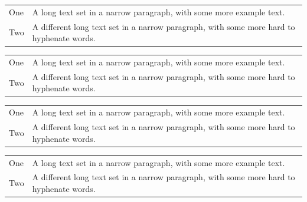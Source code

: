 \documentclass[a4paper]{article}
\begin{document}
\begin{table}
\begin{tabular}[t]{lp{3cm}}
One & A long text set in a narrow paragraph, with some more
example text. \\
Two & A different long text set in a narrow paragraph, with
some more hard to hyphenate words.
\end{tabular}%
\begin{tabular}[t]{l>{\raggedright\arraybackslash}p{3cm}}
One & A long text set in a narrow paragraph, with some more
example text. \\
Two & A different long text set in a narrow paragraph, with
some more hard to hyphenate words.
\end{tabular}%
\begin{tabular}[t]{l>{\RaggedRight}p{3cm}}
One & A long text set in a narrow paragraph, with some more
example text. \\
Two & A different long text set in a narrow paragraph, with
some more hard to hyphenate words.
\end{tabular}
\footnotesize
\begin{tabular}[t]{lp{3cm}}
One & A long text set in a narrow paragraph, with some more
example text. \\
Two & A different long text set in a narrow paragraph, with
some more hard to hyphenate words.
\end{tabular}
\end{table}
\end{document}
